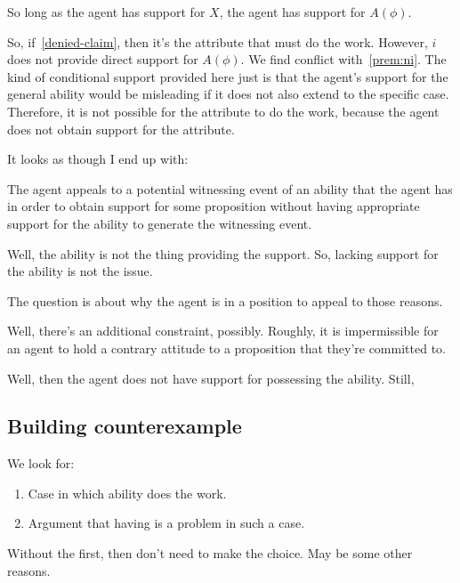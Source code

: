 \documentclass[10pt]{article}
\begin{document}
So long as the agent has support for \(X\), the agent has support for \(A(\phi)\).


So, if~\ref{denied-claim}, then it's the attribute that must do the work.
However, \(i\) does not provide direct support for \(A(\phi)\).
We find conflict with~\ref{prem:ni}.
The kind of conditional support provided here just is that the agent's support for the general ability would be misleading if it does not also extend to the specific case.
Therefore, it is not possible for the attribute to do the work, because the agent does not obtain support for the attribute.




\newpage

It looks as though I end up with:

The agent appeals to a potential witnessing event of an ability that the agent has in order to obtain support for some proposition without having appropriate support for the ability to generate the witnessing event.

Well, the ability is not the thing providing the support.
So, lacking support for the ability is not the issue.

The question is about why the agent is in a position to appeal to those reasons.

Well, there's an additional constraint, possibly.
Roughly, it is impermissible for an agent to hold a contrary attitude to a proposition that they're committed to.

Well, then the agent does not have support for possessing the ability.
Still, 











\subsection{Building counterexample}
\label{sec:build-count}

We look for:
\begin{enumerate}
\item Case in which ability does the work.
\item Argument that having is a problem in such a case.
\end{enumerate}

Without the first, then don't need to make the choice.
May be some other reasons.
\end{document}
